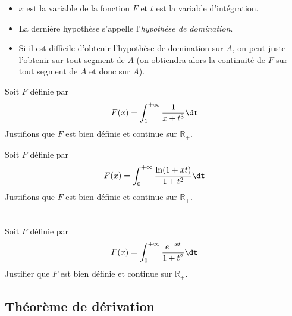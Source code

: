 \documentclass[a4paper,10pt]{report}
\begin{document}
\begin{Remarques}{}
\begin{itemize}
\item $x$ est la variable de la fonction $F$ et $t$ est la variable d'intégration.
\item La dernière hypothèse s'appelle l'\emph{hypothèse de domination}.
\item Si il est difficile d'obtenir l'hypothèse de domination sur $A$, on peut juste l'obtenir sur tout segment de $A$ (on obtiendra alors la continuité de $F$ sur tout segment de $A$ et donc sur $A$).
\end{itemize}
\end{Remarques}{}

\medskip

\begin{Exemple} Soit $F$ définie par 
$$ F(x) = \int_{1}^{+ \infty} \frac{1}{x+t^3} \dt$$
Justifions que $F$ est bien définie et continue sur $\mathbb{R}_+$.

\vspace{8.5cm}
\end{Exemple}

\begin{Exemple} Soit $F$ définie par 
$$ F(x) = \int_{0}^{+ \infty} \frac{\ln(1+xt)}{1+t^2} \dt$$
Justifions que $F$ est bien définie et continue sur $\mathbb{R}_+$.

\vspace{8.5cm}
\end{Exemple}

\newpage

$\phantom{test}$

\vspace{6cm}

\begin{ApplicationDirecte} Soit $F$ définie par 
$$ F(x) = \int_{0}^{+ \infty} \frac{e^{-xt}}{1+t^2} \dt$$
Justifier que $F$ est bien définie et continue sur $\mathbb{R}_+$.
\end{ApplicationDirecte} 

\subsection{Théorème de dérivation}
\end{document}
